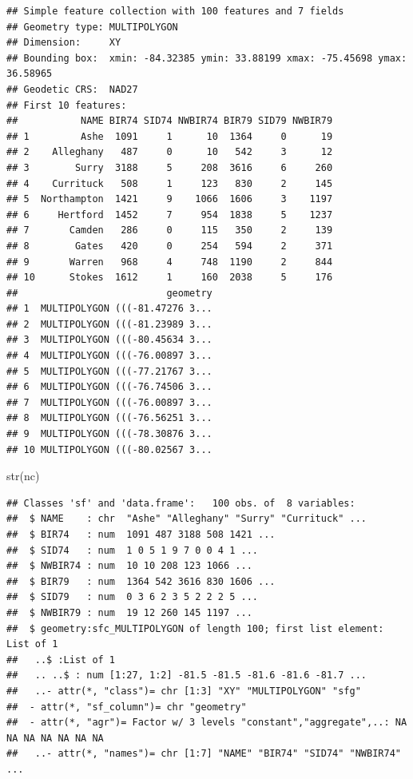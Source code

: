 \documentclass[
  spanish,
]{book}
\newenvironment{Shaded}{\begin{snugshade}}{\end{snugshade}}
\newcommand{\FunctionTok}[1]{\textcolor[rgb]{0.00,0.00,0.00}{#1}}
\newcommand{\NormalTok}[1]{#1}
\theoremstyle{break}
\theoremstyle{definition}
\theoremstyle{definition}
\theoremstyle{definition}
\theoremstyle{definition}
\theoremstyle{remark}
\begin{document}
\begin{verbatim}
## Simple feature collection with 100 features and 7 fields
## Geometry type: MULTIPOLYGON
## Dimension:     XY
## Bounding box:  xmin: -84.32385 ymin: 33.88199 xmax: -75.45698 ymax: 36.58965
## Geodetic CRS:  NAD27
## First 10 features:
##           NAME BIR74 SID74 NWBIR74 BIR79 SID79 NWBIR79
## 1         Ashe  1091     1      10  1364     0      19
## 2    Alleghany   487     0      10   542     3      12
## 3        Surry  3188     5     208  3616     6     260
## 4    Currituck   508     1     123   830     2     145
## 5  Northampton  1421     9    1066  1606     3    1197
## 6     Hertford  1452     7     954  1838     5    1237
## 7       Camden   286     0     115   350     2     139
## 8        Gates   420     0     254   594     2     371
## 9       Warren   968     4     748  1190     2     844
## 10      Stokes  1612     1     160  2038     5     176
##                          geometry
## 1  MULTIPOLYGON (((-81.47276 3...
## 2  MULTIPOLYGON (((-81.23989 3...
## 3  MULTIPOLYGON (((-80.45634 3...
## 4  MULTIPOLYGON (((-76.00897 3...
## 5  MULTIPOLYGON (((-77.21767 3...
## 6  MULTIPOLYGON (((-76.74506 3...
## 7  MULTIPOLYGON (((-76.00897 3...
## 8  MULTIPOLYGON (((-76.56251 3...
## 9  MULTIPOLYGON (((-78.30876 3...
## 10 MULTIPOLYGON (((-80.02567 3...
\end{verbatim}

\begin{Shaded}
\begin{Highlighting}[]
\FunctionTok{str}\NormalTok{(nc)}
\end{Highlighting}
\end{Shaded}

\begin{verbatim}
## Classes 'sf' and 'data.frame':   100 obs. of  8 variables:
##  $ NAME    : chr  "Ashe" "Alleghany" "Surry" "Currituck" ...
##  $ BIR74   : num  1091 487 3188 508 1421 ...
##  $ SID74   : num  1 0 5 1 9 7 0 0 4 1 ...
##  $ NWBIR74 : num  10 10 208 123 1066 ...
##  $ BIR79   : num  1364 542 3616 830 1606 ...
##  $ SID79   : num  0 3 6 2 3 5 2 2 2 5 ...
##  $ NWBIR79 : num  19 12 260 145 1197 ...
##  $ geometry:sfc_MULTIPOLYGON of length 100; first list element: List of 1
##   ..$ :List of 1
##   .. ..$ : num [1:27, 1:2] -81.5 -81.5 -81.6 -81.6 -81.7 ...
##   ..- attr(*, "class")= chr [1:3] "XY" "MULTIPOLYGON" "sfg"
##  - attr(*, "sf_column")= chr "geometry"
##  - attr(*, "agr")= Factor w/ 3 levels "constant","aggregate",..: NA NA NA NA NA NA NA
##   ..- attr(*, "names")= chr [1:7] "NAME" "BIR74" "SID74" "NWBIR74" ...
\end{verbatim}
\end{document}
